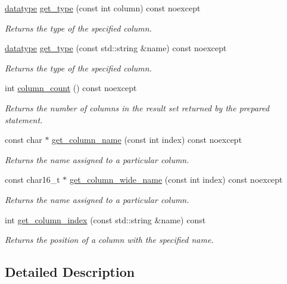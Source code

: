 \begin{DoxyCompactItemize}
\hyperlink{a00038_a7467e5cdd32bbf7fce35aced88682dc0}{datatype} \hyperlink{a00010_a2b8269e0f9387afa36ab90eb55899dc4}{get\-\_\-type} (const int column) const noexcept
\begin{DoxyCompactList}\small\item\em Returns the type of the specified column. \end{DoxyCompactList}\item 
\hyperlink{a00038_a7467e5cdd32bbf7fce35aced88682dc0}{datatype} \hyperlink{a00010_ac5ab606cf12aa4d2c9a183998420df44}{get\-\_\-type} (const std\-::string \&name) const noexcept
\begin{DoxyCompactList}\small\item\em Returns the type of the specified column. \end{DoxyCompactList}\item 
int \hyperlink{a00010_a7390afddbb1edc788f0afc6ce41f4562}{column\-\_\-count} () const noexcept
\begin{DoxyCompactList}\small\item\em Returns the number of columns in the result set returned by the prepared statement. \end{DoxyCompactList}\item 
const char $\ast$ \hyperlink{a00010_ad4c33f9b700a47c08f54e7b65afd34f2}{get\-\_\-column\-\_\-name} (const int index) const noexcept
\begin{DoxyCompactList}\small\item\em Returns the name assigned to a particular column. \end{DoxyCompactList}\item 
const char16\-\_\-t $\ast$ \hyperlink{a00010_aa7f2f528b10da75672e55fbc36566f9c}{get\-\_\-column\-\_\-wide\-\_\-name} (const int index) const noexcept
\begin{DoxyCompactList}\small\item\em Returns the name assigned to a particular column. \end{DoxyCompactList}\item 
int \hyperlink{a00010_aaca43590a209c2c7a0f7420c8a6c47b3}{get\-\_\-column\-\_\-index} (const std\-::string \&name) const 
\begin{DoxyCompactList}\small\item\em Returns the position of a column with the specified name. \end{DoxyCompactList}\end{DoxyCompactItemize}


\subsection{Detailed Description}
